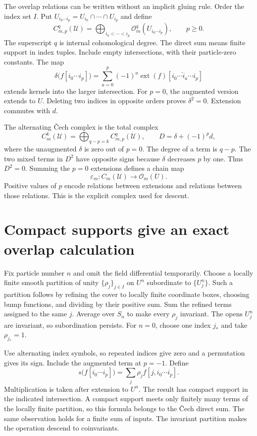 The overlap relations can be written without an implicit gluing rule.
Order the index set $I$. Put
$U_{i_0\cdots i_p}=U_{i_0}\cap\cdots\cap U_{i_p}$ and define
\[
 C_{m,p}^{q}(\mathcal U)=
 \bigoplus_{i_0<\cdots<i_p}
       \mathscr O_m^{q}(U_{i_0\cdots i_p}),\qquad p\geq0.
\]
The superscript $q$ is internal cohomological degree.
The direct sum means finite support in index tuples.
Include empty intersections, with their particle-zero constants.
The map
\[
 \delta\bigl(f[i_0\cdots i_p]\bigr)=
 \sum_{a=0}^p(-1)^a
       \operatorname{ext}(f)[i_0\cdots\widehat i_a\cdots i_p]
\]
extends kernels into the larger intersection.
For $p=0$, the augmented version extends to $U$.
Deleting two indices in opposite orders proves $\delta^2=0$.
Extension commutes with $d$.

The alternating \v Cech complex is the total complex
\begin{equation}\label{eq:clo-cech-total}
 C_m^k(\mathcal U)=\bigoplus_{q-p=k}C_{m,p}^q(\mathcal U),
 \qquad D=\delta+(-1)^p d,
\end{equation}
where the unaugmented $\delta$ is zero out of $p=0$.
The degree of a term is $q-p$.
The two mixed terms in $D^2$ have opposite signs because $\delta$
decreases $p$ by one. Thus $D^2=0$.
Summing the $p=0$ extensions defines a chain map
\[
 \varepsilon_m:C_m(\mathcal U)\longrightarrow\mathscr O_m(U).
\]
Positive values of $p$ encode relations between extensions and relations
between those relations. This is the explicit complex used for descent.

\section{Compact supports give an exact overlap calculation}
\label{sec:clo-finite-descent}

Fix particle number $n$ and omit the field differential temporarily.
Choose a locally finite smooth partition of unity $\{\rho_j\}_{j\in I}$
on $U^n$ subordinate to $\{U_j^n\}$.
Such a partition follows by refining the cover to locally finite
coordinate boxes, choosing bump functions, and dividing by their positive
sum. Sum the refined terms assigned to the same $j$.
Average over $S_n$ to make every $\rho_j$ invariant.
The opens $U_j^n$ are invariant, so subordination persists.
For $n=0$, choose one index $j_*$ and take $\rho_{j_*}=1$.

Use alternating index symbols, so repeated indices give zero and a
permutation gives its sign. Include the augmented term at $p=-1$.
Define
\begin{equation}\label{eq:clo-partition-homotopy}
 s\bigl(f[i_0\cdots i_p]\bigr)=
 \sum_j\rho_j f[j,i_0\cdots i_p].
\end{equation}
Multiplication is taken after extension to $U^n$.
The result has compact support in the indicated intersection.
A compact support meets only finitely many terms of the locally finite
partition, so this formula belongs to the \v Cech direct sum.
The same observation holds for a finite sum of inputs.
The invariant partition makes the operation descend to coinvariants.

